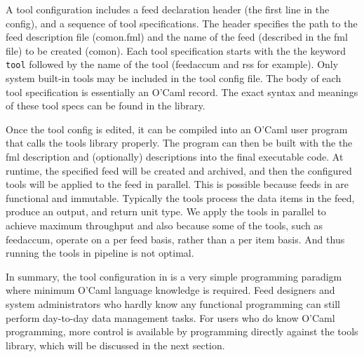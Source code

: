 A tool configuration includes a feed declaration header 
(the first line in the config),
and a sequence of tool specifications. The header specifies the path to the 
feed description file (comon.fml) and the name of the feed 
(described in the fml file) to be created (comon).
Each tool specification starts with the the keyword {\tt tool} followed by the
name of the tool (feedaccum and rss for example). Only system built-in tools may be 
included in the tool config file. The body of each tool specification is essentially
an O'Caml record. The exact syntax and meanings of these tool specs can be found in
the \padsd{} library. 

Once the tool config is edited, it can be compiled into an O'Caml user program
that calls the \padsd{} tools library properly. The program can then be built with the the
fml description and (optionally) \padsml{} descriptions into the final executable
code. At runtime, the specified feed will be created and archived, and then the
configured tools will be applied to the feed in parallel. This is possible because feeds in
\padsd{} are functional and immutable. Typically the tools process the data items
in the feed, produce an output, and return unit type. We apply the tools in parallel to
achieve maximum throughput and also because some of the tools, such as feedaccum,
operate on a per feed basis, rather than a per item basis. And thus running the tools
in pipeline is not optimal.

In summary, the tool configuration in \padsd{} is a very simple programming 
paradigm where minimum O'Caml language knowledge is required. Feed designers
and system administrators who hardly know any functional programming can still 
perform day-to-day data management tasks. For users who do know O'Caml programming, 
more control is available by programming directly against the \padsd{} 
tools library, which will be discussed in the next section.

